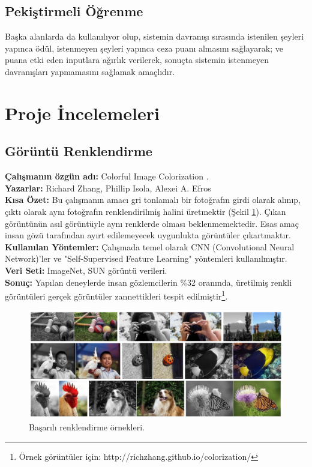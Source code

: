 \documentclass[12pt,a4paper]{article}
\renewcommand{\figurename}{Şekil}
\begin{document}
	\subsection{Pekiştirmeli Öğrenme}
	Başka alanlarda da kullanılıyor olup, sistemin davranışı sırasında istenilen şeyleri yapınca ödül,
istenmeyen şeyleri yapınca ceza puanı almasını sağlayarak; ve puana etki eden inputlara ağırlık
verilerek, sonuçta sistemin istenmeyen davranışları yapmamasını sağlamak amaçlıdır.

    \section{Proje İncelemeleri}

    \subsection{Görüntü Renklendirme}
    \textbf{Çalışmanın özgün adı:} Colorful Image Colorization \cite{colorful}. \\
    \textbf{Yazarlar:} Richard Zhang, Phillip Isola, Alexei A. Efros \\
    \textbf{Kısa Özet:} Bu çalışmanın amacı gri tonlamalı bir fotoğrafın girdi olarak alınıp,
    çıktı olarak aynı fotoğrafın renklendirilmiş halini üretmektir (\figurename{} \ref{fig:color}). Çıkan görüntünün asıl
    görüntüyle aynı renklerde olması beklenmemektedir. Esas amaç insan gözü tarafından ayırt
    edilemeyecek uygunlukta görüntüler çıkartmaktır. \\
    \textbf{Kullanılan Yöntemler:} Çalışmada temel olarak CNN (Convolutional Neural Network)'ler ve "Self-Supervised Feature
    Learning" yöntemleri kullanılmıştır. \\
    \textbf{Veri Seti:} ImageNet\cite{imagenet}, SUN\cite{sun} görüntü verileri. \\
    \textbf{Sonuç:} Yapılan deneylerde insan gözlemcilerin \%32 oranında, üretilmiş renkli görüntüleri
    gerçek görüntüler zannettikleri tespit edilmiştir\footnote{Örnek görüntüler için: http://richzhang.github.io/colorization/}.

    \begin{figure}[!h]
        \begin{center}
            \includegraphics[width=\linewidth]{resimler/color.png}
            \caption{Başarılı renklendirme örnekleri.\cite{colorful}}
            \label{fig:color}
        \end{center}
    \end{figure}
\end{document}
